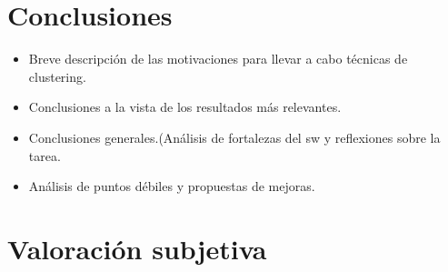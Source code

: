 \documentclass[10pt,a4paper]{article}
\begin{document}
%
%
%



\section{Conclusiones}

	\begin{itemize}
		\item Breve descripción de las motivaciones para llevar a cabo técnicas de clustering.
		\item Conclusiones a la vista de los resultados más relevantes.
		\item Conclusiones generales.(Análisis de fortalezas del sw y reflexiones sobre la tarea.
		\item Análisis de puntos débiles y propuestas de mejoras.
	\end{itemize}

\section{Valoración subjetiva}
\end{document}
